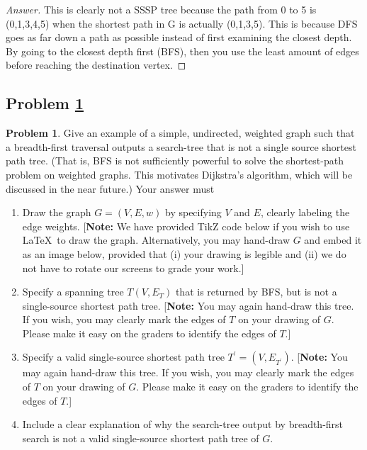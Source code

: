 \documentclass[11pt]{article}
\theoremstyle{definition}
\theoremstyle{definition}
\newtheorem{required}{Problem}
\theoremstyle{definition}
\begin{document}
\begin{proof}[Answer]
This is clearly not a SSSP tree because the path from 0 to 5 is (0,1,3,4,5) when the shortest path in G is actually (0,1,3,5). This is because DFS goes as far down a path as possible instead of first examining the closest depth. By going to the closest depth first (BFS), then you use the least amount of edges before reaching the destination vertex.  

\end{proof}





\newpage
\subsection{Problem \ref{DFS4}}
\begin{required} \label{DFS4}
	Give an example of a simple, undirected, weighted graph such that a breadth-first traversal outputs a search-tree that is not a single source shortest path tree. (That is, BFS is not sufficiently powerful to solve the shortest-path problem on weighted graphs. This motivates Dijkstra's algorithm, which will be discussed in the near future.) 
	Your answer must
	\begin{enumerate}[label=(\alph*)]
		\item Draw the graph $G = (V,E, w)$ by specifying $V$ and $E$, clearly labeling the edge weights.  [\textbf{Note:} We have provided TikZ code below if you wish to use \LaTeX \ to draw the graph. Alternatively, you may hand-draw $G$ and embed it as an image below, provided that (i) your drawing is legible and (ii) we do not have to rotate our screens to grade your work.]
		\item Specify a spanning tree $T(V, E_{T})$ that is returned by BFS, but is not a single-source shortest path tree. [\textbf{Note:} You may again hand-draw this tree. If you wish, you may clearly mark the edges of $T$ on your drawing of $G$. Please make it easy on the graders to identify the edges of $T$.] 

		\item Specify a valid single-source shortest path tree $T^{\prime} = (V,E_{T^{\prime}})$.  [\textbf{Note:} You may again hand-draw this tree. If you wish, you may clearly mark the edges of $T$ on your drawing of $G$. Please make it easy on the graders to identify the edges of $T$.] 

		\item Include a clear explanation of why the search-tree output by breadth-first search is not a valid single-source shortest path tree of $G$.
	\end{enumerate}
\end{required}
\end{document}
